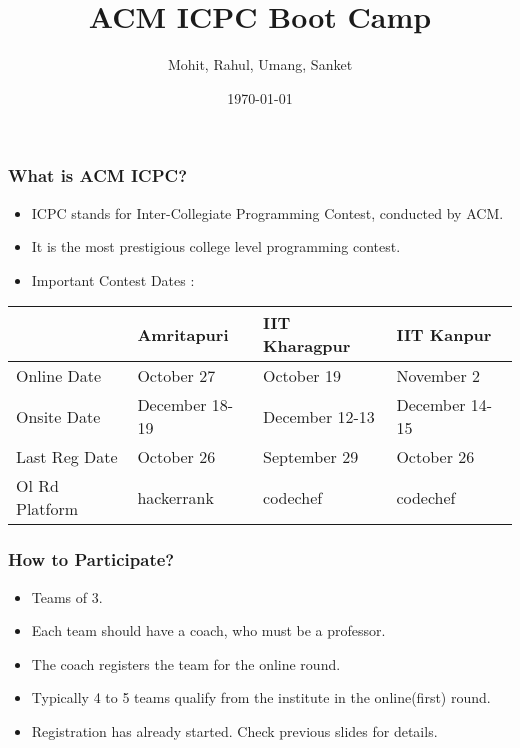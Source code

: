 \documentclass{beamer}
\title[ACM ICPC Boot Camp]{ACM ICPC Boot Camp} %
\author{Mohit, Rahul, Umang, Sanket} %
\institute[IITB] %
{
IIT Bombay \\ %
}
\date{\today} %
\begin{document}
\begin{frame}
\titlepage %
\end{frame}


\begin{frame}
\frametitle{What is ACM ICPC?}
\begin{itemize}
\item ICPC stands for Inter-Collegiate Programming Contest,
conducted by ACM.
\item It is the most prestigious college level programming contest.
\item Important Contest Dates :
\end{itemize}
\begin{table}
\begin{tabular}{l l l l}
\toprule
\textbf{} & \textbf{Amritapuri} & \textbf{IIT Kharagpur} & \textbf{IIT Kanpur}\\
\midrule
Online Date & October 27 & October 19 & November 2  \\
Onsite Date & December 18-19 & December 12-13 & December 14-15 \\
Last Reg Date & October 26 & September 29 & October 26 \\
Ol Rd Platform &	hackerrank &	codechef &	codechef \\
\bottomrule
\end{tabular}
\end{table}

\end{frame}


\begin{frame}
\frametitle{How to Participate?}
\begin{itemize}

\item Teams of 3.
\item Each team should have a coach, who must be a professor.
\item The coach registers the team for the online round.
\item Typically 4 to 5 teams qualify from the institute in the
online(first) round.
\item Registration has already started. Check previous slides for details.
\end{itemize}
\end{frame}

\end{document}
